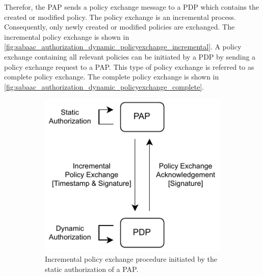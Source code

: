 \begin{description}
    Therefor, the PAP sends a policy exchange message to a PDP which contains the created or modified policy.
    The policy exchange is an incremental process.
    Consequently, only newly created or modified policies are exchanged.
    The incremental policy exchange is shown in \autoref{fig:sabaac_authorization_dynamic_policyexchange_incremental}.
    A policy exchange containing all relevant policies can be initiated by a PDP by sending a policy exchange request to a PAP.
    This type of policy exchange is referred to as complete policy exchange.
    The complete policy exchange is shown in \autoref{fig:sabaac_authorization_dynamic_policyexchange_complete}.
    \begin{figure}
        \centering
        \begin{subfigure}[t]{0.48\linewidth}
            \centering
            \includegraphics[width=\linewidth]{figures/SABAAC_protocols_authorization_dynamic_policyexchange_incremental.drawio.pdf}
            \caption{Incremental policy exchange procedure initiated by the static authorization of a PAP.}
            \label{fig:sabaac_authorization_dynamic_policyexchange_incremental}
        \end{subfigure}
        \hfill
        \begin{subfigure}[t]{0.48\linewidth}
            \centering

\end{subfigure}
\end{figure}
\end{description}
